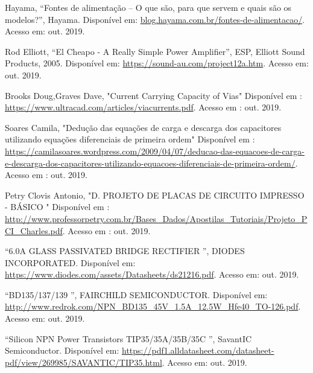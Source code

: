 \documentclass[a4paper,12pt,oneside,openany,table,xcdraw]{article}
\begin{document}
\newpage
\begin{thebibliography}{9} 

    Hayama,
    “Fontes de alimentação – O que são, para que servem e quais são os modelos?”, Hayama.
 Disponível em:
 \url{blog.hayama.com.br/fontes-de-alimentacao/}. Acesso em: out. 2019.

    Rod Elliott,
    “El Cheapo - A Really Simple Power Amplifier”, ESP, Elliott Sound Products, 2005.
 Disponível em:
 \url{https://sound-au.com/project12a.htm}. Acesso em: out. 2019.
 
    Brooks Doug,Graves Dave,
    "Current Carrying Capacity of Vias"
 Disponível em : 
 \url{https://www.ultracad.com/articles/viacurrents.pdf}. Acesso em : out. 2019.
 
    Soares Camila,
 "Dedução das equações de carga e descarga dos capacitores utilizando equações diferenciais de primeira ordem"
  Disponível em : 
 \url{https://camilasoares.wordpress.com/2009/04/07/deducao-das-equacoes-de-carga-e-descarga-dos-capacitores-utilizando-equacoes-diferenciais-de-primeira-ordem/}.
 Acesso em : out. 2019.
 
    Petry Clovis Antonio,
 "D. PROJETO DE PLACAS DE CIRCUITO
IMPRESSO - BÁSICO "
  Disponível em : 
 \url{http://www.professorpetry.com.br/Bases_Dados/Apostilas_Tutoriais/Projeto_PCI_Charles.pdf}. Acesso em : out. 2019.
 
 
        “6.0A GLASS PASSIVATED BRIDGE RECTIFIER
”, DIODES INCORPORATED.
 Disponível em:
 \url{https://www.diodes.com/assets/Datasheets/ds21216.pdf}. Acesso em: out. 2019.
 
    “BD135/137/139
”, FAIRCHILD SEMICONDUCTOR.
 Disponível em:
 \url{http://www.redrok.com/NPN_BD135_45V_1.5A_12.5W_Hfe40_TO-126.pdf}. Acesso em: out. 2019.
 
    “Silicon NPN Power Transistors TIP35/35A/35B/35C ”, SavantIC Semiconductor. 
 Disponível em:
 \url{https://pdf1.alldatasheet.com/datasheet-pdf/view/269985/SAVANTIC/TIP35.html}. Acesso em: out. 2019.
 


\end{thebibliography}
\end{document}
